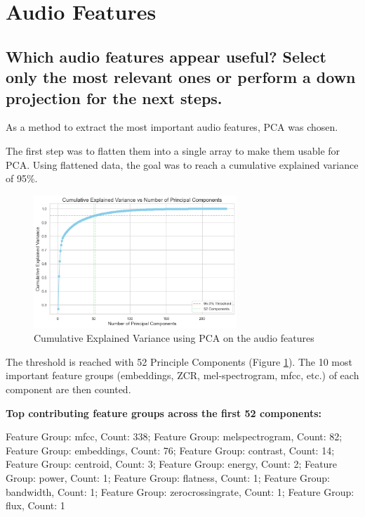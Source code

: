 
\section{Audio Features}
\label{sec:Audio Features}

\subsection{Which audio features appear useful? Select only the most relevant ones or perform a down projection for the next steps.}
\label{sec:Audio Features:a}

As a method to extract the most important audio features, PCA was chosen.

The first step was to flatten them into a single array to make them usable for PCA. Using flattened data, the goal was to reach a cumulative explained variance of 95\%. 

\pagebreak

\begin{figure}[htbp]
    \centering
    \includegraphics[width=0.5\linewidth, height=5cm]{figs/Cumulative Explained Variance.png}
    \caption{Cumulative Explained Variance using PCA on the audio features}
    \label{fig:Cumulative Explained Variance}
\end{figure}

The threshold is reached with 52 Principle Components (Figure \ref{fig:Cumulative Explained Variance}).  The 10 most important feature groups (embeddings, ZCR, mel-spectrogram, mfcc, etc.) of each component are then counted. 

\textbf{Top contributing feature groups across the first 52 components:}

Feature Group: mfcc, Count: 338;
Feature Group: melspectrogram, Count: 82;
Feature Group: embeddings, Count: 76;
Feature Group: contrast, Count: 14;
Feature Group: centroid, Count: 3;
Feature Group: energy, Count: 2;
Feature Group: power, Count: 1;
Feature Group: flatness, Count: 1;
Feature Group: bandwidth, Count: 1;
Feature Group: zerocrossingrate, Count: 1;
Feature Group: flux, Count: 1

